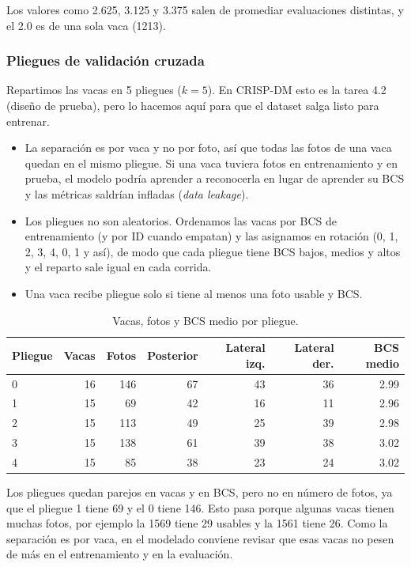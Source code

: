 Los valores como 2.625, 3.125 y 3.375 salen de promediar evaluaciones distintas, y el 2.0 es de una sola vaca (1213).

\subsubsection*{Pliegues de validación cruzada}

Repartimos las vacas en 5 pliegues ($k = 5$). En CRISP-DM esto es la tarea 4.2 (diseño de prueba), pero lo hacemos aquí para que el dataset salga listo para entrenar.

\begin{itemize}
  \item La separación es por vaca y no por foto, así que todas las fotos de una vaca quedan en el mismo pliegue. Si una vaca tuviera fotos en entrenamiento y en prueba, el modelo podría aprender a reconocerla en lugar de aprender su BCS y las métricas saldrían infladas (\textit{data leakage}).
  \item Los pliegues no son aleatorios. Ordenamos las vacas por BCS de entrenamiento (y por ID cuando empatan) y las asignamos en rotación (0, 1, 2, 3, 4, 0, 1 y así), de modo que cada pliegue tiene BCS bajos, medios y altos y el reparto sale igual en cada corrida.
  \item Una vaca recibe pliegue solo si tiene al menos una foto usable y BCS.
\end{itemize}

\begin{table}[H]
  \centering
  \caption{Vacas, fotos y BCS medio por pliegue.}
  \label{tab:pliegues}
  \begin{tabular}{lrrrrrr}
    \toprule
    Pliegue & Vacas & Fotos & Posterior & Lateral izq. & Lateral der. & BCS medio \\
    \midrule
    0 & 16 & 146 & 67 & 43 & 36 & 2.99 \\
    1 & 15 & 69 & 42 & 16 & 11 & 2.96 \\
    2 & 15 & 113 & 49 & 25 & 39 & 2.98 \\
    3 & 15 & 138 & 61 & 39 & 38 & 3.02 \\
    4 & 15 & 85 & 38 & 23 & 24 & 3.02 \\
    \bottomrule
  \end{tabular}
\end{table}

Los pliegues quedan parejos en vacas y en BCS, pero no en número de fotos, ya que el pliegue 1 tiene 69 y el 0 tiene 146. Esto pasa porque algunas vacas tienen muchas fotos, por ejemplo la 1569 tiene 29 usables y la 1561 tiene 26. Como la separación es por vaca, en el modelado conviene revisar que esas vacas no pesen de más en el entrenamiento y en la evaluación.

